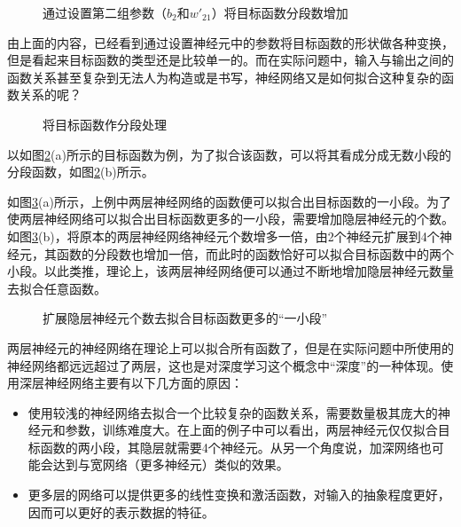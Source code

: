 \begin{figure}[htp]
\centering

\caption{通过设置第二组参数（$b_2$和$w'_{21}$）将目标函数分段数增加}
\label{fig:9-22}
\end {figure}

\parinterval 由上面的内容，已经看到通过设置神经元中的参数将目标函数的形状做各种变换，但是看起来目标函数的类型还是比较单一的。而在实际问题中，输入与输出之间的函数关系甚至复杂到无法人为构造或是书写，神经网络又是如何拟合这种复杂的函数关系的呢？

\begin{figure}[htp]
\centering

\caption{将目标函数作分段处理}
\label{fig:9-23}
\end {figure}

\parinterval 以如图\ref{fig:9-23}(a)所示的目标函数为例，为了拟合该函数，可以将其看成分成无数小段的分段函数，如图\ref{fig:9-23}(b)所示。

\parinterval 如图\ref{fig:9-24}(a)所示，上例中两层神经网络的函数便可以拟合出目标函数的一小段。为了使两层神经网络可以拟合出目标函数更多的一小段，需要增加隐层神经元的个数。如图\ref{fig:9-24}(b)，将原本的两层神经网络神经元个数增多一倍，由2个神经元扩展到4个神经元，其函数的分段数也增加一倍，而此时的函数恰好可以拟合目标函数中的两个小段。以此类推，理论上，该两层神经网络便可以通过不断地增加隐层神经元数量去拟合任意函数。

\begin{figure}[htp]
\centering

\caption{扩展隐层神经元个数去拟合目标函数更多的“一小段”}
\label{fig:9-24}
\end {figure}

\parinterval 两层神经元的神经网络在理论上可以拟合所有函数了，但是在实际问题中所使用的神经网络都远远超过了两层，这也是对深度学习这个概念中“深度”的一种体现。使用深层神经网络主要有以下几方面的原因：

\begin{itemize}
\vspace{0.5em}
\item 使用较浅的神经网络去拟合一个比较复杂的函数关系，需要数量极其庞大的神经元和参数，训练难度大。在上面的例子中可以看出，两层神经元仅仅拟合目标函数的两小段，其隐层就需要4个神经元。从另一个角度说，加深网络也可能会达到与宽网络（更多神经元）类似的效果。
\vspace{0.5em}
\item 更多层的网络可以提供更多的线性变换和激活函数，对输入的抽象程度更好，因而可以更好的表示数据的特征。
\vspace{0.5em}
\end{itemize}

